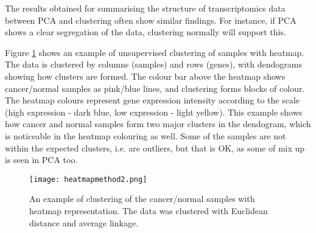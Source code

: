     The results obtained for summarising the structure of transcriptomics data between PCA and clustering often show similar findings. For instance, if PCA shows a clear segregation of the data, clustering normally will support this.
    
    Figure \ref{fig:heatmapmethod} shows an example of unsupervised clustering of samples with heatmap. The data is clustered by columns (samples) and rows (genes), with dendograms showing how clusters are formed. The colour bar above the heatmap shows cancer/normal samples as pink/blue lines, and clustering forms blocks of colour. The heatmap colours  represent gene expression intensity according to the scale (high expression - dark blue, low expression - light yellow). This example shows how cancer and normal samples form two major clusters in the dendogram, which is noticeable in the heatmap colouring as well. Some of the samples are not within the expected clusters, i.e. are outliers, but that is OK, as some of mix up is seen in PCA too. 
    
            \begin{figure}[h]
            \centering
            \texttt{[image: heatmapmethod2.png]}
            \caption{An example of clustering of the cancer/normal samples with heatmap representation. The data was clustered with Euclidean distance and average linkage. }
            \label{fig:heatmapmethod}
            \end{figure}
    
    
    
    
    

